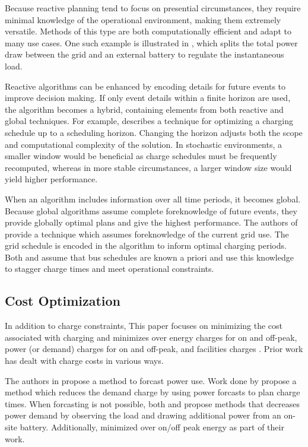\par Because reactive planning tend to focus on presential circumstances, they require minimal knowledge of the operational environment, making them extremely versatile.  Methods of this type are both computationally efficient and adapt to many use cases.  One such example is illustrated in \cite{cheng_smart_2020}, which splits the total power draw between the grid and an external battery to regulate the instantaneous load. 
\par Reactive algorithms can be enhanced by encoding details for future events to improve decision making. If only event details within a finite horizon are used, the algorithm becomes a hybrid, containing elements from both reactive and global techniques. For example, \cite{bagherinezhad_spatio-temporal_2020} describes a technique for optimizing a charging schedule up to a scheduling horizon. Changing the horizon adjusts both the scope and computational complexity of the solution. In stochastic environments, a smaller window would be beneficial as charge schedules must be frequently recomputed, whereas in more stable circumstances, a larger window size would yield higher performance. 
\par When an algorithm includes information over all time periods, it becomes global. Because global algorithms assume complete foreknowledge of future events, they provide globally optimal plans and give the highest performance. The authors of \cite{jahic_preemptive_2019} provide a technique which assumes foreknowledge of the current grid use. The grid schedule is encoded in the algorithm to inform optimal charging periods. Both \cite{whitaker_network_2021} and \cite{el-taweel_incorporation_2019} assume that bus schedules are known a priori and use this knowledge to stagger charge times and meet operational constraints. 
\subsection{Cost Optimization}
In addition to charge constraints, This paper focuses on minimizing the cost associated with charging and minimizes over energy charges for on and off-peak, power (or demand) charges for on and off-peak, and facilities charges \cite{noauthor_rocky_nodate}. Prior work has dealt with charge costs in various ways.  
\par The authors in \cite{gao_charging_2019} propose a method to forcast power use. Work done by \cite{qin_numerical_2016} propose a method which reduces the demand charge by using power forcasts \cite{gao_charging_2019} to plan charge times.  When forcasting is not possible, both \cite{ojer_development_2020} and \cite{cheng_smart_2020} propose methods that decreases power demand by observing the load and drawing additional power from an on-site battery. Additionally, \cite{el-taweel_incorporation_2019} minimized over on/off peak energy as part of their work.

